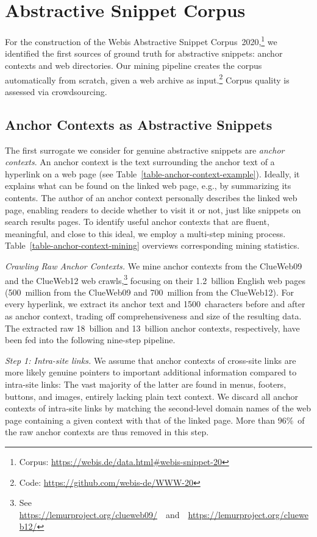 \documentclass[sigconf]{acmart}
\newcommand{\bslabel}[1]{\textsl{#1.}}
\begin{document}
 \section{Abstractive Snippet Corpus}
\label{abstractive-snippet-corpus}

For the construction of the Webis Abstractive Snippet Corpus~2020,\footnote{Corpus: \url{https://webis.de/data.html\#webis-snippet-20}}
we identified the first sources of ground truth for abstractive snippets: anchor contexts and web directories. Our mining pipeline creates the corpus automatically from scratch, given a web archive as input.\footnote{Code: \url{https://github.com/webis-de/WWW-20}}
Corpus quality is assessed via crowdsourcing.

\subsection{Anchor Contexts as Abstractive Snippets}

The first surrogate we consider for genuine abstractive snippets are \emph{anchor contexts}. An anchor context is the text surrounding the anchor text of a hyperlink on a web page (see Table~\ref{table-anchor-context-example}). Ideally, it explains what can be found on the linked web page, e.g., by summarizing its contents. The author of an anchor context personally describes the linked web page, enabling readers to decide whether to visit it or not, just like snippets on search results pages. To identify useful anchor contexts that are fluent, meaningful, and close to this ideal, we employ a multi-step mining process. Table~\ref{table-anchor-context-mining} overviews corresponding mining statistics.

\bslabel{Crawling Raw Anchor Contexts}
We mine anchor contexts from the ClueWeb09 and the ClueWeb12 web crawls,\footnote{See \url{https://lemurproject.org/clueweb09/}~~and~~\url{https://lemurproject.org/clueweb12/}}
focusing on their 1.2~billion English web pages (500~million from the ClueWeb09 and 700~million from the ClueWeb12). For every hyperlink, we extract its anchor text and 1500~characters before and after as anchor context, trading off comprehensiveness and size of the resulting data. The extracted raw 18~billion and 13~billion anchor contexts, respectively, have been fed into the following nine-step pipeline.

\bslabel{Step 1: Intra-site links}
We assume that anchor contexts of cross-site links are more likely genuine pointers to important additional information compared to intra-site links: The vast majority of the latter are found in menus, footers, buttons, and images, entirely lacking plain text context. We discard all anchor contexts of intra-site links by matching the second-level domain names of the web page containing a given context with that of the linked page. More than 96\%~of the raw anchor contexts are thus removed in this step.
\end{document}
